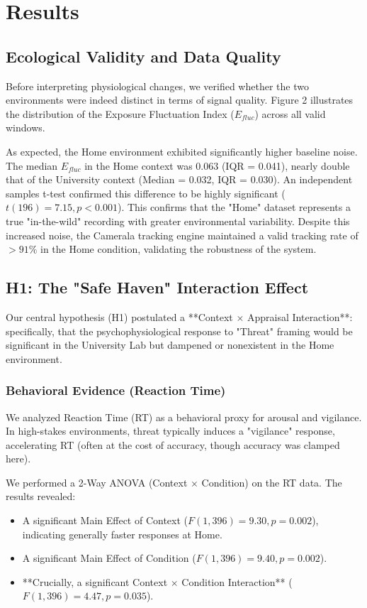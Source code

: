 \section{Results}

\subsection{Ecological Validity and Data Quality}
Before interpreting physiological changes, we verified whether the two environments were indeed distinct in terms of signal quality. Figure 2 illustrates the distribution of the Exposure Fluctuation Index ($E_{fluc}$) across all valid windows.

As expected, the Home environment exhibited significantly higher baseline noise. The median $E_{fluc}$ in the Home context was $0.063$ (IQR = 0.041), nearly double that of the University context (Median = 0.032, IQR = 0.030). An independent samples t-test confirmed this difference to be highly significant ($t(196) = 7.15, p < 0.001$). This confirms that the "Home" dataset represents a true "in-the-wild" recording with greater environmental variability. Despite this increased noise, the Camerala tracking engine maintained a valid tracking rate of $>91\%$ in the Home condition, validating the robustness of the system.

\subsection{H1: The "Safe Haven" Interaction Effect}

Our central hypothesis (H1) postulated a **Context $\times$ Appraisal Interaction**: specifically, that the psychophysiological response to "Threat" framing would be significant in the University Lab but dampened or nonexistent in the Home environment.

\subsubsection{Behavioral Evidence (Reaction Time)}
We analyzed Reaction Time (RT) as a behavioral proxy for arousal and vigilance. In high-stakes environments, threat typically induces a "vigilance" response, accelerating RT (often at the cost of accuracy, though accuracy was clamped here).

We performed a 2-Way ANOVA (Context $\times$ Condition) on the RT data. The results revealed:
\begin{itemize}
    \item A significant Main Effect of Context ($F(1,396) = 9.30, p = 0.002$), indicating generally faster responses at Home.
    \item A significant Main Effect of Condition ($F(1,396) = 9.40, p = 0.002$).
    \item **Crucially, a significant Context $\times$ Condition Interaction** ($F(1,396) = 4.47, p = 0.035$).
\end{itemize}

